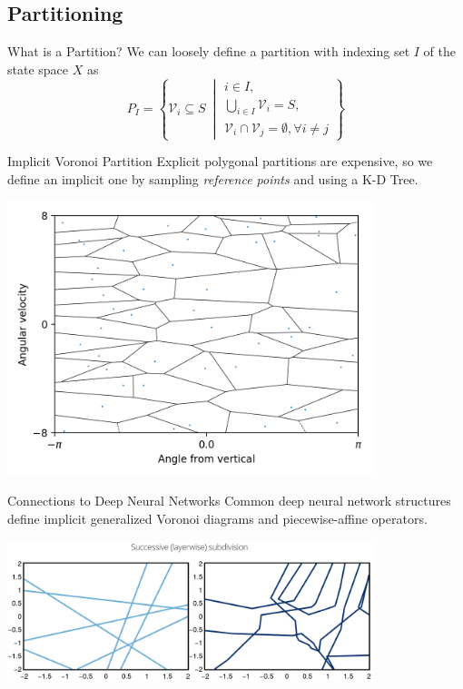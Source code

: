 \documentclass{beamer}
\begin{document}
\subsection{Partitioning}

\begin{frame}{What is a Partition?}
  We can loosely define a partition with indexing set $I$ of the state space $X$ as
  \begin{equation}
    P_I = \left\{\mathcal{V}_i \subseteq S\ \middle\vert 
      \begin{array}{l}
        i \in I, \\
        \bigcup_{i \in I}\mathcal{V}_i = S, \\
        \mathcal{V}_i \cap \mathcal{V}_j = \emptyset, \forall i \neq j
      \end{array}\right\}
  \end{equation}
\end{frame}

\begin{frame}{Implicit Voronoi Partition}
  Explicit polygonal partitions are expensive, so we define an implicit one by
  sampling \emph{reference points} and using a K-D Tree.

  \begin{center}
    \includegraphics[keepaspectratio,width=0.8\textwidth]{assets/pendulum_voronoi}
  \end{center}
\end{frame}

\begin{frame}{Connections to Deep Neural Networks}
  Common deep neural network structures define implicit generalized Voronoi
  diagrams and piecewise-affine operators. 

  \begin{center}
    \includegraphics[keepaspectratio,width=0.8\textwidth]{assets/subdivision}
  \end{center}
\end{frame}
\end{document}
